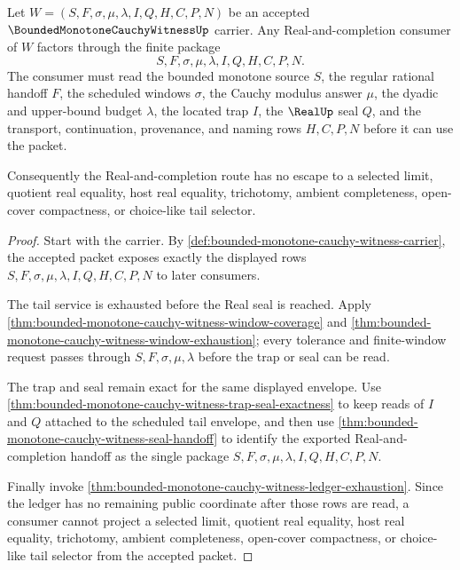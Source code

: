 \begin{theorem}
\label{thm:bounded-monotone-cauchy-witness-real-route-nonescape}
Let $W=(S,F,\sigma,\mu,\lambda,I,Q,H,C,P,N)$ be an accepted $\BoundedMonotoneCauchyWitnessUp$ carrier. Any Real-and-completion consumer of $W$ factors through the finite package
$$
S,F,\sigma,\mu,\lambda,I,Q,H,C,P,N.
$$
The consumer must read the bounded monotone source $S$, the regular rational handoff $F$, the scheduled windows $\sigma$, the Cauchy modulus answer $\mu$, the dyadic and upper-bound budget $\lambda$, the located trap $I$, the $\RealUp$ seal $Q$, and the transport, continuation, provenance, and naming rows $H,C,P,N$ before it can use the packet.

Consequently the Real-and-completion route has no escape to a selected limit, quotient real equality, host real equality, trichotomy, ambient completeness, open-cover compactness, or choice-like tail selector.
\end{theorem}
\begin{proof}
Start with the carrier. By \autoref{def:bounded-monotone-cauchy-witness-carrier}, the accepted packet exposes exactly the displayed rows $S,F,\sigma,\mu,\lambda,I,Q,H,C,P,N$ to later consumers.

The tail service is exhausted before the Real seal is reached. Apply \autoref{thm:bounded-monotone-cauchy-witness-window-coverage} and \autoref{thm:bounded-monotone-cauchy-witness-window-exhaustion}; every tolerance and finite-window request passes through $S,F,\sigma,\mu,\lambda$ before the trap or seal can be read.

The trap and seal remain exact for the same displayed envelope. Use \autoref{thm:bounded-monotone-cauchy-witness-trap-seal-exactness} to keep reads of $I$ and $Q$ attached to the scheduled tail envelope, and then use \autoref{thm:bounded-monotone-cauchy-witness-seal-handoff} to identify the exported Real-and-completion handoff as the single package $S,F,\sigma,\mu,\lambda,I,Q,H,C,P,N$.

Finally invoke \autoref{thm:bounded-monotone-cauchy-witness-ledger-exhaustion}. Since the ledger has no remaining public coordinate after those rows are read, a consumer cannot project a selected limit, quotient real equality, host real equality, trichotomy, ambient completeness, open-cover compactness, or choice-like tail selector from the accepted packet.
\end{proof}
